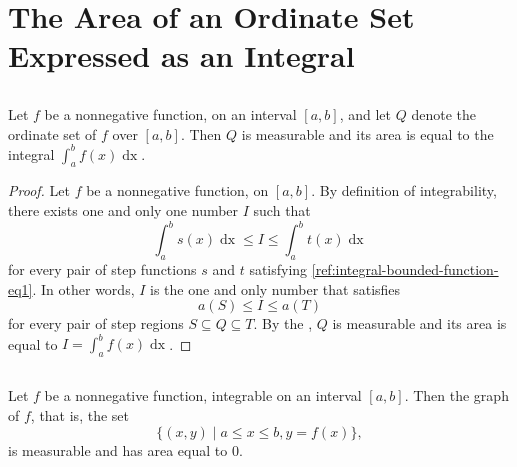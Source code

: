 \documentclass{report}
\begin{document}
\section{The Area of an Ordinate Set Expressed as an Integral}%
\label{sec:area-ordinate-set-expressed-integral}

\subsection{}%
\label{sub:theorem-1.10}

\begin{theorem}[1.10]

  Let $f$ be a nonnegative function,  on an interval
    $[a, b]$, and let $Q$ denote the ordinate set of $f$ over $[a, b]$.
  Then $Q$ is measurable and its area is equal to the integral
    $\int_a^b f(x) \mathop{dx}$.

\end{theorem}

\begin{proof}

  Let $f$ be a nonnegative function,  on $[a, b]$.
  By definition of integrability, there exists one and only one number $I$ such
    that $$\int_a^b s(x) \mathop{dx} \leq I \leq \int_a^b t(x) \mathop{dx}$$ for
    every pair of step functions $s$ and $t$ satisfying
    \eqref{ref:integral-bounded-function-eq1}.
  In other words, $I$ is the one and only number that satisfies
    $$a(S) \leq I \leq a(T)$$ for every pair of step regions
    $S \subseteq Q \subseteq T$.
  By the , $Q$ is measurable and its area
    is equal to $I = \int_a^b f(x) \mathop{dx}$.

\end{proof}

\subsection{}%
\label{sub:theorem-1.11}

\begin{theorem}[1.11]

  Let $f$ be a nonnegative function, integrable on an interval $[a, b]$.
  Then the graph of $f$, that is, the set
    \begin{equation}
      \label{sub:theorem-1.11-eq1}
      \{(x, y) \mid a \leq x \leq b, y = f(x)\},
    \end{equation}
    is measurable and has area equal to $0$.

\end{theorem}
\end{document}
